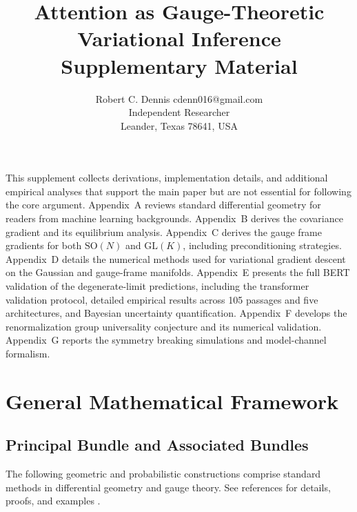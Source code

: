 \documentclass[twoside,11pt]{article}
\begin{document}

\title{Attention as Gauge-Theoretic Variational Inference\\[6pt]
\large Supplementary Material}

\author{\name Robert C. Dennis \email cdenn016@gmail.com \\
       \addr Independent Researcher\\
       \addr Leander, Texas 78641, USA}


\maketitle


This supplement collects derivations, implementation details, and additional empirical analyses that support the main paper but are not essential for following the core argument.  Appendix~A reviews standard differential geometry for readers from machine learning backgrounds. Appendix~B derives the covariance gradient and its equilibrium analysis.  Appendix~C derives the gauge frame gradients for both $\mathrm{SO}(N)$ and $\mathrm{GL}(K)$, including preconditioning strategies.  Appendix~D details the numerical methods used for variational gradient descent on the Gaussian and gauge-frame manifolds. Appendix~E presents the full BERT validation of the degenerate-limit predictions, including the transformer validation protocol, detailed empirical results across 105 passages and five architectures, and Bayesian uncertainty quantification. Appendix~F develops the renormalization group universality conjecture and its numerical validation. Appendix~G reports the symmetry breaking simulations and model-channel formalism.

\appendix

\section{General Mathematical Framework}
\subsection{Principal Bundle and Associated Bundles}

The following geometric and probabilistic constructions comprise standard methods in differential geometry and gauge theory.  See references for details, proofs, and examples \citep{nakahara2003geometry,frankel2011geometry,blei2017variational,amari2016information}.
\end{document}
